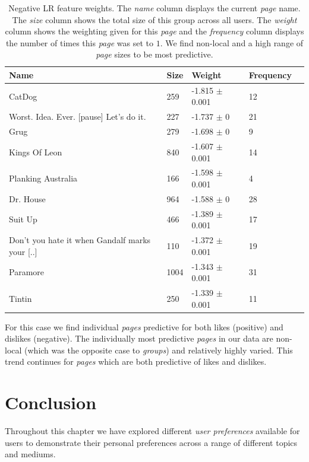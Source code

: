 \begin{table}[h]
\begin{minipage}[b]{1.0\textwidth}
\centering
  \begin{tabular}{|l|l|l|l|l|} %
  \hline
  \textbf{Name} & \textbf{Size} & \textbf{Weight} & \textbf{Frequency} \\ \hline
\small{CatDog}  & 259 & -1.815 $\pm$ 0.001 & 12 \\ \hline
\small{Worst. Idea. Ever. [pause] Let's do it.}  & 227 & -1.737 $\pm$ 0 & 21 \\ \hline
\small{Grug}  & 279 & -1.698 $\pm$ 0 & 9 \\ \hline
\small{Kings Of Leon}  & 840 & -1.607 $\pm$ 0.001 & 14 \\ \hline
\small{Planking Australia}  & 166 & -1.598 $\pm$ 0.001 & 4 \\ \hline
\small{Dr. House}  & 964 & -1.588 $\pm$ 0 & 28 \\ \hline
\small{Suit Up}  & 466 & -1.389 $\pm$ 0.001 & 17 \\ \hline
\small{Don't you hate it when Gandalf marks your [..]}  & 110 & -1.372 $\pm$ 0.001 & 19 \\ \hline
\small{Paramore}  & 1004 & -1.343 $\pm$ 0.001 & 31 \\ \hline
\small{Tintin}  & 250 & -1.339 $\pm$ 0.001 & 11 \\ \hline
  \end{tabular}
 \caption{Negative LR feature weights. The \emph{name} column displays the current \emph{page} name.
  The \emph{size} column shows the total size of this group across all users.
  The \emph{weight} column shows the weighting given for this \emph{page} and the \emph{frequency} column displays the number of times 
  this \emph{page} was set to $1$. We find non-local and a high range of \emph{page} sizes to be most predictive.}
\end{minipage}
\end{table}

For this case we find individual \emph{pages} predictive for both likes (positive) and dislikes (negative). 
The individually most predictive \emph{pages} in our data are non-local (which was the opposite case to \emph{groups}) and
relatively highly varied. This trend continues for \emph{pages} which are both predictive of likes and dislikes.

\section{Conclusion}
\label{sec:conc}
Throughout this chapter we have explored different \emph{user preferences} available for users to demonstrate their personal preferences across a range of 
different topics and mediums.

